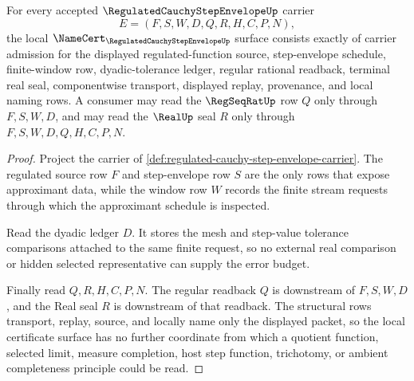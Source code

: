 \begin{theorem}
\label{thm:regulated-cauchy-step-envelope-namecert-obligations}
For every accepted $\RegulatedCauchyStepEnvelopeUp$ carrier
$$
E=(F,S,W,D,Q,R,H,C,P,N),
$$
the local $\NameCert_{\RegulatedCauchyStepEnvelopeUp}$ surface consists exactly of carrier admission for the displayed regulated-function source, step-envelope schedule, finite-window row, dyadic-tolerance ledger, regular rational readback, terminal real seal, componentwise transport, displayed replay, provenance, and local naming rows. A consumer may read the $\RegSeqRatUp$ row $Q$ only through $F,S,W,D$, and may read the $\RealUp$ seal $R$ only through $F,S,W,D,Q,H,C,P,N$.
\end{theorem}
\begin{proof}
Project the carrier of \autoref{def:regulated-cauchy-step-envelope-carrier}. The regulated source row $F$ and step-envelope row $S$ are the only rows that expose approximant data, while the window row $W$ records the finite stream requests through which the approximant schedule is inspected.

Read the dyadic ledger $D$. It stores the mesh and step-value tolerance comparisons attached to the same finite request, so no external real comparison or hidden selected representative can supply the error budget.

Finally read $Q,R,H,C,P,N$. The regular readback $Q$ is downstream of $F,S,W,D$, and the Real seal $R$ is downstream of that readback. The structural rows transport, replay, source, and locally name only the displayed packet, so the local certificate surface has no further coordinate from which a quotient function, selected limit, measure completion, host step function, trichotomy, or ambient completeness principle could be read.
\end{proof}

